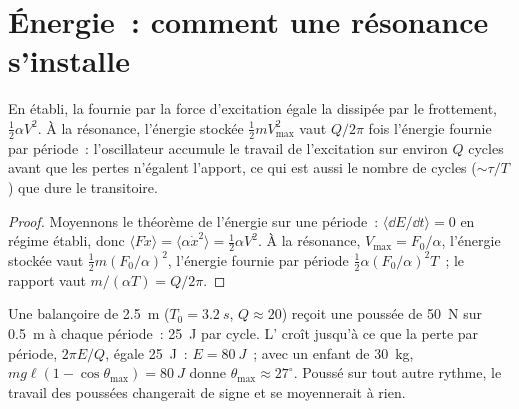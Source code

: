 \section{Énergie~: comment une résonance s'installe}

\begin{proposition}\label{prop:b1:oscillators-resonance:energy}
En  établi, la  fournie par la force
d'excitation égale la  dissipée par le frottement,
$\tfrac12\alpha V^2$. À la résonance, l'énergie stockée
$\tfrac12 mV_{\max}^2$ vaut $Q/2\pi$ fois l'énergie fournie par
période~: l'oscillateur accumule le travail de l'excitation sur environ
$Q$ cycles avant que les pertes n'égalent l'apport, ce qui est aussi le
nombre de cycles ($\sim\tau/T$) que dure le transitoire.
\end{proposition}

\begin{proof}
Moyennons le théorème de l'énergie sur une période~: $\langle\dd E/\dd t\rangle = 0$
en régime établi, donc $\langle F\dot x\rangle = \langle\alpha\dot x^2\rangle =
\tfrac12\alpha V^2$. À la résonance, $V_{\max} = F_0/\alpha$, l'énergie
stockée vaut $\tfrac12 m(F_0/\alpha)^2$, l'énergie fournie par période $\tfrac12\alpha(F_0/\alpha)^2T$~;
le rapport vaut $m/(\alpha T) = Q/2\pi$.
\end{proof}

\begin{example}[La balançoire]\label{ex:b1:oscillators-resonance:swing}
Une balançoire de \qty{2.5}{m} ($T_0 = \qty{3.2}{s}$, $Q \approx 20$)
reçoit une poussée de \qty{50}{N} sur \qty{0.5}{m} à chaque période~:
\qty{25}{J} par cycle. L' croît jusqu'à ce que la perte par
période, $2\pi E/Q$, égale \qty{25}{J}~: $E = \qty{80}{J}$~; avec un
enfant de \qty{30}{kg}, $mg\ell(1 -
\cos\theta_{\max}) = \qty{80}{J}$ donne $\theta_{\max} \approx 27^\circ$.
Poussé sur tout autre rythme, le travail des poussées changerait de
signe et se moyennerait à rien.
\end{example}

